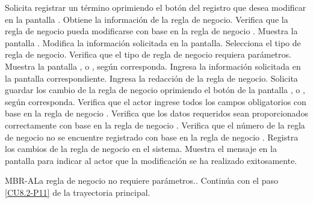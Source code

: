 	\begin{UCtrayectoria}
		\UCpaso[\UCactor] Solicita registrar un término oprimiendo el botón  del registro que desea modificar en la pantalla .
		\UCpaso[\UCsist] Obtiene la información de la regla de negocio.
		\UCpaso[\UCsist] Verifica que la regla de negocio pueda modificarse con base en la regla de negocio . 
		\UCpaso[\UCsist] Muestra la pantalla .
		\UCpaso[\UCactor] Modifica la información solicitada en la pantalla. \label{CU8.2-P5}
		\UCpaso[\UCactor] Selecciona el tipo de regla de negocio.
		\UCpaso[\UCsist] Verifica que el tipo de regla de negocio requiera parámetros. 
		\UCpaso[\UCsist] Muestra la pantalla ,  o , según corresponda.
		\UCpaso[\UCsist] Ingresa la información solicitada en la pantalla correspondiente.
		\UCpaso[\UCsist] Ingresa la redacción de la regla de negocio. \label{CU8.2-P11}
		\UCpaso[\UCactor] Solicita guardar los cambio de la regla de negocio oprimiendo el botón  de la pantalla ,  o , según corresponda. 
		\UCpaso[\UCsist] Verifica que el actor ingrese todos los campos obligatorios con base en la regla de negocio . 
		\UCpaso[\UCsist] Verifica que los datos requeridos sean proporcionados correctamente con base en la regla de negocio .  
		\UCpaso[\UCsist] Verifica que el número de la regla de negocio no se encuentre registrado con base en la regla de negocio . 
		\UCpaso[\UCsist] Registra los cambios de la regla de negocio en el sistema.
		\UCpaso[\UCsist] Muestra el mensaje  en la pantalla  para indicar al actor que la modificación se ha realizado exitosamente.
	\end{UCtrayectoria}		
	
	\begin{UCtrayectoriaA}{MBR-A}{La regla de negocio no requiere parámetros..}
		\UCpaso[\UCactor] Continúa con el paso \ref{CU8.2-P11} de la trayectoria principal.
	\end{UCtrayectoriaA}
	
